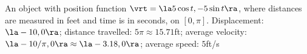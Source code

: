 {An object with position function $\vrt = \la 5\cos t,-5\sin t\ra$, where distances are measured in feet and time is in seconds, on $[0,\pi]$.
}
{Displacement: $\la -10,0\ra$; distance travelled: $5\pi \approx 15.71$ft; average velocity: $\la -10/\pi,0\ra\approx \la -3.18,0\ra$; average speed: $5$ft/s
}